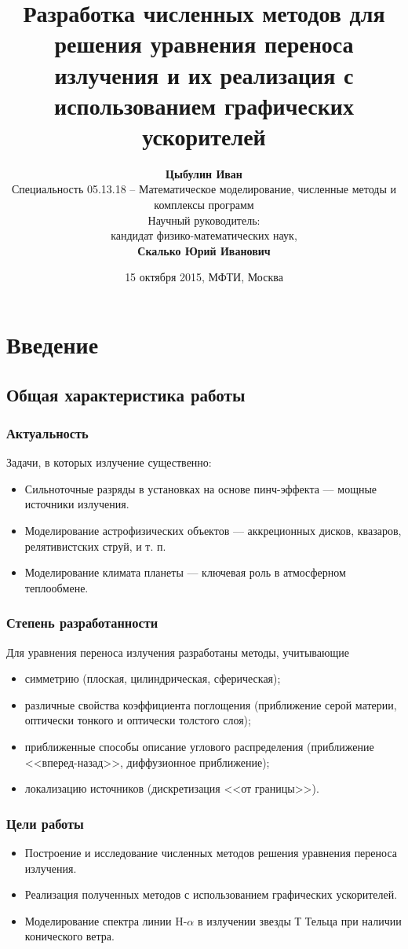 \documentclass[unicode,aspectratio=43]{beamer}
\title[Численные методы решения УПИ]{Разработка численных методов для решения уравнения переноса излучения и их реализация с использованием графических ускорителей}
\date{15 октября 2015, МФТИ, Москва}
\author[Цыбулин Иван]{\textbf{Цыбулин Иван}\\[1ex]
Специальность 05.13.18 -- Математическое моделирование, численные методы и
комплексы программ\\[1ex]
Научный руководитель:\\
кандидат физико-математических наук,\\
\textbf{Скалько Юрий Иванович}}
\institute[МФТИ]{Московский физико-технический институт}
\begin{document}
\begin{frame}[plain]
\maketitle
\end{frame}

\begin{frame}[plain]
\footnotesize
\tableofcontents
\end{frame}

\section{Введение}

\subsection{Общая характеристика работы}

\begin{frame}\frametitle{Актуальность}
	Задачи, в которых излучение существенно:
	\begin{itemize}
	\item Сильноточные разряды в установках на основе пинч-эффекта --- мощные источники излучения.
	\item Моделирование астрофизических объектов --- аккреционных дисков, квазаров, релятивистских струй, и т. п.
	\item Моделирование климата планеты --- ключевая роль в атмосферном теплообмене.
	\end{itemize}
\end{frame}

\begin{frame}\frametitle{Степень разработанности}
	Для уравнения переноса излучения разработаны методы, учитывающие
	\begin{itemize}
	\item симметрию (плоская, цилиндрическая, сферическая);
	\item различные свойства коэффициента поглощения (приближение серой материи, оптически тонкого и оптически толстого слоя);
	\item приближенные способы описание углового распределения (приближение <<вперед-назад>>, диффузионное приближение);
	\item локализацию источников (дискретизация <<от границы>>).
	\end{itemize}
\end{frame}

\begin{frame}\frametitle{Цели работы}
	\begin{itemize}
	\item Построение и исследование численных методов решения уравнения переноса излучения.
	\item Реализация полученных методов с использованием графических ускорителей.
	\item Моделирование спектра линии H-$\alpha$ в излучении звезды Т Тельца при наличии конического ветра.
	\end{itemize}
\end{frame}
\end{document}
